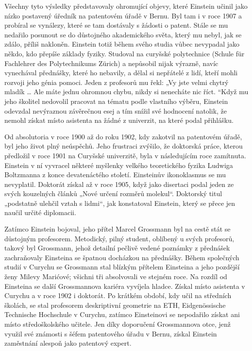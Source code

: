   Všechny tyto výsledky představovaly ohromující objevy, které Einstein učinil jako nízko postavený
  úředník na patentovém úřadě v Bernu. Byl tam i v roce 1907 a probíral se vynálezy, které se tam
  dostávaly s žádosti o patent. Stále se mu nedařilo posunout se do důstojného akademického světa,
  který mu nebyl, jak se zdálo, příliš nakloněn. Einstein totiž během svého studia vůbec nevypadal
  jako někdo, kdo přepíše základy fyziky. Studoval na curyšské polytechnice (Schule für Fachlehrer
  des Polytechnikums Zürich) a nepůsobil nijak výrazně, navíc vynechával přednášky, které ho
  nebavily, a dělal si nepřátelé z lidí, kteří mohli rozvoji jeho génia pomoci. Jeden z profesorů mu
  řekl: „Vy jste velmi chytrý mladík … Ale máte jednu ohromnou chybu, nikdy si nenecháte nic říct.
  “Když mu jeho školitel nedovolil pracovat na tématu podle vlastního výběru, Einstein odevzdal
  nevýraznou závěrečnou esej a tím snížil své hodnocení natolik, že nemohl získat místo asistenta na
  žádné z univerzit, na které podal přihlášku. 

  Od absolutoria v roce 1900 až do roku 1902, kdy zakotvil na patentovém úřadě, byl jeho život plný
  neúspěchů. Jeho frustraci zvýšilo, že doktorská práce, kterou předložil v roce 1901 na Curyšské
  univerzitě, byla v následujícím roce zamítnuta. Einstein v ní vyvracel některé myšlenky velkého
  teoretického fyzika Ludwiga Boltzmanna z konce devatenáctého století. Einsteinův ikonoklasmus se
  mu nevyplatil. Doktorát získal až v roce 1905, když jako disertaci podal jeden ze svých kouzelných
  článků „Nové určení rozměrů molekul“. Doktorský titul „podstatně ulehčil vztah s lidmi“, jak
  konstatoval Einstein, který se přece jen naučil určité diplomacii. 

  Zatímco Einstein bojoval, jeho přítel Marcel Grossmann byl na cestě stát se důstojným profesorem.
  Metodický, pilný student, oblíbený u svých profesorů, takový byl Grossmann, jehož detailní pečlivě
  vedené poznámky z přednášek zachraňovaly Einsteina se špatnou docházkou na přednášky. Během
  společných studií v Curychu se Grossmann stal blízkým přítelem Einsteina a jeho pozdější ženy
  Milevy Marićové; všichni tři absolvovali ve stejném roce. Na rozdíl od Einsteina se další
  Grossmannova kariéra vyvíjela hladce. Získal místo asistenta v Curychu a v roce 1902 i doktorát.
  Po krátkém období, kdy učil na středních školách, se stal profesorem deskriptivní geometrie na
  ETH, Eidgenössische Technische Hochschule v Curychu, zatímco Einsteinovi se nepodařilo získat ani
  místo středoškolského učitele. Jen díky doporučení Grossmannova otce, jenž využil své známosti s
  šéfem patentového úřadu v Bernu, získal Einstein zaměstnání alespoň jako patentový expert. 

